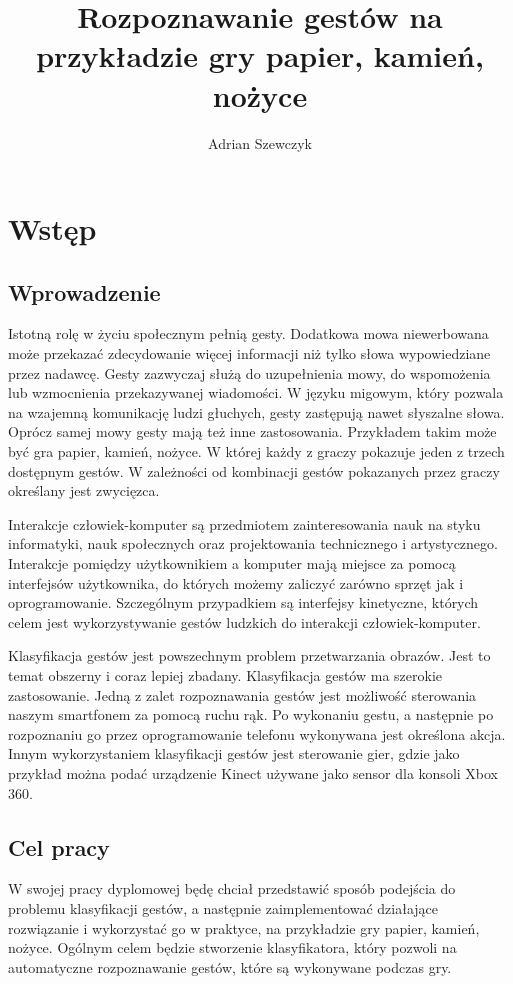\documentclass[a4paper,12pt,twoside,openany]{report}
\title{Rozpoznawanie gestów na przykładzie gry papier, kamień, nożyce}
\author{Adrian Szewczyk}
\begin{document}
\maketitle


\chapter{Wstęp}
\section{Wprowadzenie}
Istotną rolę w życiu społecznym pełnią gesty. Dodatkowa mowa niewerbowana może przekazać zdecydowanie więcej informacji niż tylko słowa wypowiedziane przez nadawcę. Gesty zazwyczaj służą do uzupełnienia mowy, do wspomożenia lub wzmocnienia przekazywanej wiadomości\cite{Collins}. W języku migowym, który pozwala na wzajemną komunikację ludzi głuchych, gesty zastępują nawet słyszalne słowa. Oprócz samej mowy gesty mają też inne zastosowania. Przykładem takim może być gra papier, kamień, nożyce. W której każdy z graczy pokazuje jeden z trzech dostępnym gestów. W zależności od kombinacji gestów pokazanych przez graczy określany jest zwycięzca.

Interakcje człowiek-komputer są przedmiotem zainteresowania nauk na styku informatyki, nauk społecznych oraz projektowania technicznego i artystycznego. Interakcje pomiędzy użytkownikiem a komputer mają miejsce za pomocą interfejsów użytkownika, do których możemy zaliczyć zarówno sprzęt jak i oprogramowanie\cite{Kostkiewicz}. Szczególnym przypadkiem są interfejsy kinetyczne, których celem jest wykorzystywanie gestów ludzkich do interakcji człowiek-komputer.

Klasyfikacja gestów jest powszechnym problem przetwarzania obrazów. Jest to temat obszerny i coraz lepiej zbadany. Klasyfikacja gestów ma szerokie zastosowanie. Jedną z zalet rozpoznawania gestów jest możliwość sterowania naszym smartfonem za pomocą ruchu rąk. Po wykonaniu gestu, a następnie po rozpoznaniu go przez  oprogramowanie telefonu wykonywana jest określona akcja. Innym wykorzystaniem klasyfikacji gestów jest sterowanie gier, gdzie jako przykład można podać urządzenie Kinect używane jako sensor dla konsoli Xbox 360\cite{Kinect}.

\section{Cel pracy}
W swojej pracy dyplomowej będę chciał przedstawić sposób podejścia do problemu klasyfikacji gestów, a następnie zaimplementować działające rozwiązanie i wykorzystać go w praktyce, na przykładzie gry papier, kamień, nożyce. Ogólnym celem będzie stworzenie klasyfikatora, który pozwoli na automatyczne rozpoznawanie gestów, które są wykonywane podczas gry.
\end{document}
